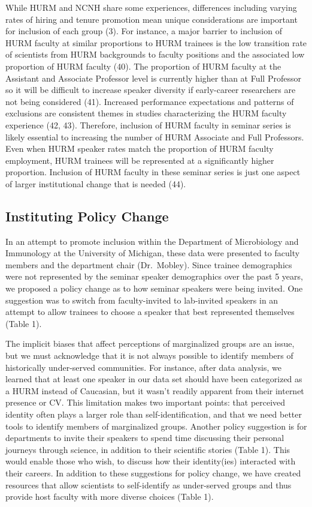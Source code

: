 \documentclass[10pt,]{article}
\begin{document}
While HURM and NCNH share some experiences, differences including
varying rates of hiring and tenure promotion mean unique considerations
are important for inclusion of each group (3). For instance, a major
barrier to inclusion of HURM faculty at similar proportions to HURM
trainees is the low transition rate of scientists from HURM backgrounds
to faculty positions and the associated low proportion of HURM faculty
(40). The proportion of HURM faculty at the Assistant and Associate
Professor level is currently higher than at Full Professor so it will be
difficult to increase speaker diversity if early-career researchers are
not being considered (41). Increased performance expectations and
patterns of exclusions are consistent themes in studies characterizing
the HURM faculty experience (42, 43). Therefore, inclusion of HURM
faculty in seminar series is likely essential to increasing the number
of HURM Associate and Full Professors. Even when HURM speaker rates
match the proportion of HURM faculty employment, HURM trainees will be
represented at a significantly higher proportion. Inclusion of HURM
faculty in these seminar series is just one aspect of larger
institutional change that is needed (44).

\subsection{Instituting Policy Change}\label{instituting-policy-change}

In an attempt to promote inclusion within the Department of Microbiology
and Immunology at the University of Michigan, these data were presented
to faculty members and the department chair (Dr.~Mobley). Since trainee
demographics were not represented by the seminar speaker demographics
over the past 5 years, we proposed a policy change as to how seminar
speakers were being invited. One suggestion was to switch from
faculty-invited to lab-invited speakers in an attempt to allow trainees
to choose a speaker that best represented themselves (Table 1).

The implicit biases that affect perceptions of marginalized groups are
an issue, but we must acknowledge that it is not always possible to
identify members of historically under-served communities. For instance,
after data analysis, we learned that at least one speaker in our data
set should have been categorized as a HURM instead of Caucasian, but it
wasn't readily apparent from their internet presence or CV. This
limitation makes two important points: that perceived identity often
plays a larger role than self-identification, and that we need better
tools to identify members of marginalized groups. Another policy
suggestion is for departments to invite their speakers to spend time
discussing their personal journeys through science, in addition to their
scientific stories (Table 1). This would enable those who wish, to
discuss how their identity(ies) interacted with their careers. In
addition to these suggestions for policy change, we have created
resources that allow scientists to self-identify as under-served groups
and thus provide host faculty with more diverse choices (Table 1).
\end{document}
